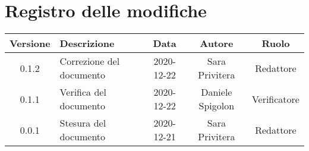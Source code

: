 \section*{Registro delle modifiche}

\begin{center}
	\begin{longtable}{|c|p{5cm}|c|c|c|}
	\hline
	\rowcolor{lighter-grayer}
	\textbf{Versione} & \textbf{Descrizione} & \textbf{Data} & \textbf{Autore} & \textbf{Ruolo} \\
	\hline
	\endfirsthead


	\hline
	0.1.2 & Correzione del documento & 2020-12-22 & Sara Privitera & Redattore \\
	\hline
	0.1.1 & Verifica del documento & 2020-12-22 & Daniele Spigolon & Verificatore \\
	\hline
	0.0.1 & Stesura del documento & 2020-12-21 & Sara Privitera & Redattore \\
	\hline
	
    
	\end{longtable}
\end{center}
